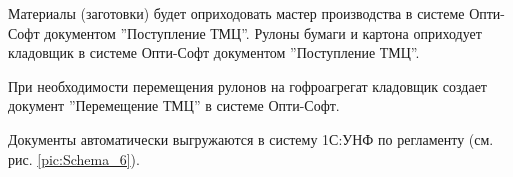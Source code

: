 Материалы (заготовки) будет оприходовать мастер производства в системе Опти-Софт документом ''Поступление ТМЦ''. Рулоны бумаги и картона оприходует кладовщик 
в системе Опти-Софт документом ''Поступление ТМЦ''.

При необходимости перемещения рулонов на гофроагрегат кладовщик создает документ ''Перемещение ТМЦ'' в системе Опти-Софт.



Документы автоматически выгружаются в систему 1С:УНФ по регламенту (см. рис. \ref{pic:Schema_6}).

%
%
%
%
%
%